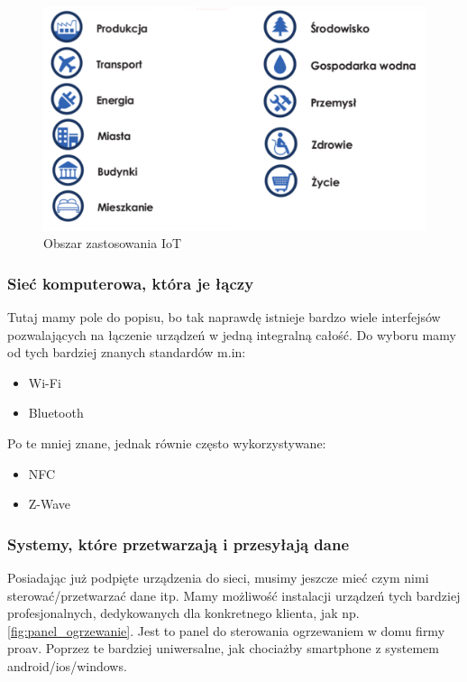 \begin{figure}[!htbp]
	\centering
	\includegraphics[width=1.0\textwidth]{images/zastosowania.png}
	\caption[Obszar zastosowania IoT.]{Obszar zastosowania IoT}
	\label{fig:zastosowania_iot}
\end{figure}
\subsubsection{Sieć komputerowa, która je łączy}
Tutaj mamy pole do popisu, bo tak naprawdę istnieje bardzo wiele interfejsów pozwalających na łączenie urządzeń w jedną integralną całość. Do wyboru mamy od tych bardziej znanych standardów m.in:

\begin{itemize}
	\item Wi-Fi
	\item Bluetooth
\end{itemize}
Po te mniej znane, jednak równie często wykorzystywane:
\begin{itemize}
	\item NFC 
	\item Z-Wave 
\end{itemize}

\subsubsection{Systemy, które przetwarzają i przesyłają dane}
Posiadając już podpięte urządzenia do sieci, musimy jeszcze mieć czym nimi sterować/przetwarzać dane itp. Mamy możliwość instalacji urządzeń tych bardziej profesjonalnych, dedykowanych dla konkretnego klienta, jak np. \autoref{fig:panel_ogrzewanie}. Jest to panel do sterowania ogrzewaniem w domu firmy proav. Poprzez te bardziej uniwersalne, jak chociażby smartphone z systemem android/ios/windows.

